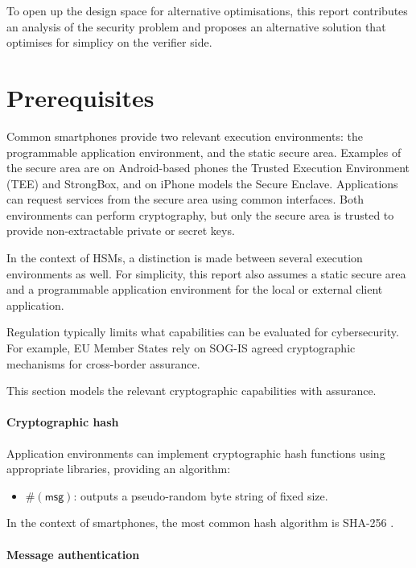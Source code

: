 \documentclass[a4paper]{article}
\begin{document}
To open up the design space for alternative optimisations, this report contributes an analysis of the security problem and proposes an alternative solution that optimises for simplicy on the verifier side.

\section{Prerequisites}

Common smartphones provide two relevant execution environments: the programmable application environment, and the static secure area. Examples of the secure area are on Android-based phones the Trusted Execution Environment (TEE) and StrongBox, and on iPhone models the Secure Enclave. Applications can request services from the secure area using common interfaces. Both environments can perform cryptography, but only the secure area is trusted to provide non-extractable private or secret keys.

In the context of HSMs, a distinction is made between several execution environments as well. For simplicity, this report also assumes a static secure area and a programmable application environment for the local or external client application.

Regulation typically limits what capabilities can be evaluated for cybersecurity. For example, EU Member States rely on SOG-IS agreed cryptographic mechanisms \cite{SOGIS-ACM} for cross-border assurance.

This section models the relevant cryptographic capabilities with assurance.

\paragraph{Cryptographic hash}

Application environments can implement cryptographic hash functions using appropriate libraries, providing an algorithm:
\begin{itemize}
\item $\#(\mathsf{msg})$: outputs a pseudo-random byte string of fixed size.
\end{itemize}
In the context of smartphones, the most common hash algorithm is SHA-256 \cite{FIPS180-4}.

\paragraph{Message authentication}
\end{document}
